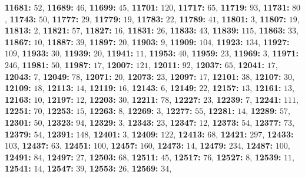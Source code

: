\textsf{\bfseries 11681:} $52$, \textsf{\bfseries 11689:} $46$, \textsf{\bfseries 11699:} $45$, \textsf{\bfseries 11701:} $120$, \textsf{\bfseries 11717:} $65$, \textsf{\bfseries 11719:} $93$, \textsf{\bfseries 11731:} $80$, \textsf{\bfseries 11743:} $50$, \textsf{\bfseries 11777:} $29$, \textsf{\bfseries 11779:} $19$, \textsf{\bfseries 11783:} $22$, \textsf{\bfseries 11789:} $41$, \textsf{\bfseries 11801:} $3$, \textsf{\bfseries 11807:} $19$, \textsf{\bfseries 11813:} $2$, \textsf{\bfseries 11821:} $57$, \textsf{\bfseries 11827:} $16$, \textsf{\bfseries 11831:} $26$, \textsf{\bfseries 11833:} $43$, \textsf{\bfseries 11839:} $115$, \textsf{\bfseries 11863:} $33$, \textsf{\bfseries 11867:} $10$, \textsf{\bfseries 11887:} $39$, \textsf{\bfseries 11897:} $20$, \textsf{\bfseries 11903:} $9$, \textsf{\bfseries 11909:} $104$, \textsf{\bfseries 11923:} $134$, \textsf{\bfseries 11927:} $109$, \textsf{\bfseries 11933:} $30$, \textsf{\bfseries 11939:} $20$, \textsf{\bfseries 11941:} $11$, \textsf{\bfseries 11953:} $40$, \textsf{\bfseries 11959:} $23$, \textsf{\bfseries 11969:} $3$, \textsf{\bfseries 11971:} $246$, \textsf{\bfseries 11981:} $50$, \textsf{\bfseries 11987:} $17$, \textsf{\bfseries 12007:} $121$, \textsf{\bfseries 12011:} $92$, \textsf{\bfseries 12037:} $65$, \textsf{\bfseries 12041:} $17$, \textsf{\bfseries 12043:} $7$, \textsf{\bfseries 12049:} $78$, \textsf{\bfseries 12071:} $20$, \textsf{\bfseries 12073:} $23$, \textsf{\bfseries 12097:} $17$, \textsf{\bfseries 12101:} $38$, \textsf{\bfseries 12107:} $30$, \textsf{\bfseries 12109:} $18$, \textsf{\bfseries 12113:} $14$, \textsf{\bfseries 12119:} $16$, \textsf{\bfseries 12143:} $6$, \textsf{\bfseries 12149:} $22$, \textsf{\bfseries 12157:} $13$, \textsf{\bfseries 12161:} $13$, \textsf{\bfseries 12163:} $10$, \textsf{\bfseries 12197:} $12$, \textsf{\bfseries 12203:} $30$, \textsf{\bfseries 12211:} $78$, \textsf{\bfseries 12227:} $23$, \textsf{\bfseries 12239:} $7$, \textsf{\bfseries 12241:} $111$, \textsf{\bfseries 12251:} $70$, \textsf{\bfseries 12253:} $15$, \textsf{\bfseries 12263:} $8$, \textsf{\bfseries 12269:} $3$, \textsf{\bfseries 12277:} $55$, \textsf{\bfseries 12281:} $14$, \textsf{\bfseries 12289:} $57$, \textsf{\bfseries 12301:} $50$, \textsf{\bfseries 12323:} $94$, \textsf{\bfseries 12329:} $3$, \textsf{\bfseries 12343:} $23$, \textsf{\bfseries 12347:} $12$, \textsf{\bfseries 12373:} $54$, \textsf{\bfseries 12377:} $73$, \textsf{\bfseries 12379:} $54$, \textsf{\bfseries 12391:} $148$, \textsf{\bfseries 12401:} $3$, \textsf{\bfseries 12409:} $122$, \textsf{\bfseries 12413:} $68$, \textsf{\bfseries 12421:} $297$, \textsf{\bfseries 12433:} $103$, \textsf{\bfseries 12437:} $63$, \textsf{\bfseries 12451:} $100$, \textsf{\bfseries 12457:} $160$, \textsf{\bfseries 12473:} $14$, \textsf{\bfseries 12479:} $234$, \textsf{\bfseries 12487:} $100$, \textsf{\bfseries 12491:} $84$, \textsf{\bfseries 12497:} $27$, \textsf{\bfseries 12503:} $68$, \textsf{\bfseries 12511:} $45$, \textsf{\bfseries 12517:} $76$, \textsf{\bfseries 12527:} $8$, \textsf{\bfseries 12539:} $11$, \textsf{\bfseries 12541:} $14$, \textsf{\bfseries 12547:} $39$, \textsf{\bfseries 12553:} $26$, \textsf{\bfseries 12569:} $34$, 
